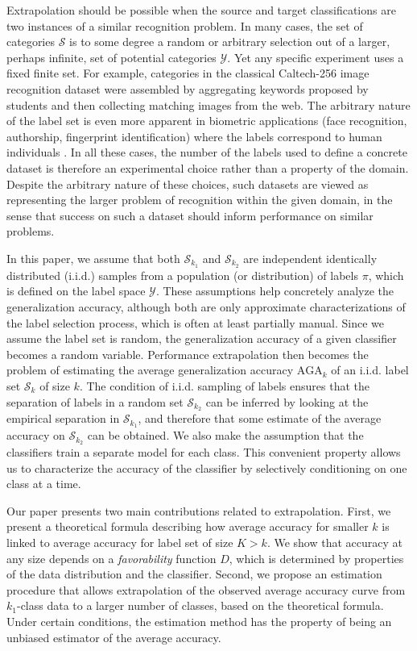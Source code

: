 \documentclass[twoside,11pt]{article}
\begin{document}
Extrapolation should be possible when the source and target
classifications are two instances of a similar recognition problem.  In
many cases, the set of categories $\mathcal{S}$ is to some degree a
random or arbitrary selection out of a larger, perhaps infinite, set
of potential categories $\mathcal{Y}$. Yet any specific experiment
uses a fixed finite set.  For example, categories in the classical
Caltech-256 image recognition dataset \citep{griffin2007caltech} were
assembled by aggregating keywords proposed by students and then
collecting matching images from the web.  The arbitrary nature of the
label set is even more apparent in biometric applications (face
recognition, authorship, fingerprint identification) where the labels
correspond to human individuals \citep{togneri2011overview,
  stamatatos2014overview}.  In all these cases, the number of the
labels used to define a concrete dataset is therefore an experimental
choice rather than a property of the domain.  Despite the arbitrary
nature of these choices, such datasets are viewed as representing the
larger problem of recognition within the given domain, in the sense
that success on such a dataset should inform performance on similar
problems.

In this paper, we assume that both $\mathcal{S}_{k_1}$ and
$\mathcal{S}_{k_2}$ are independent identically distributed (i.i.d.)
samples from a population (or distribution) of labels $ \pi$, which is
defined on the label space $\mathcal{Y}$.  These assumptions help
concretely analyze the generalization accuracy, although both are only
approximate characterizations of the label selection process, which is
often at least partially manual. Since we assume the label set is
random, the generalization accuracy of a given classifier becomes a
random variable.  Performance extrapolation then becomes the problem
of estimating the average generalization accuracy $\text{AGA}_k$ of an
i.i.d. label set $\mathcal{S}_k$ of size $k$.  The condition of
i.i.d. sampling of labels ensures that the separation of labels in a
random set $\mathcal{S}_{k_2}$ can be inferred by looking at the
empirical separation in $\mathcal{S}_{k_1}$, and therefore that some
estimate of the average accuracy on $\mathcal{S}_{k_2}$ can be
obtained.  We also make the assumption that the classifiers train a
separate model for each class.  This convenient property allows us to
characterize the accuracy of the classifier by selectively
conditioning on one class at a time.

Our paper presents two main contributions related to extrapolation.
First, we present a theoretical formula describing how average accuracy
for smaller $k$ is linked to average accuracy for label set of size
$K>k$.  We show that accuracy at any size depends on a
\emph{favorability} function ${D}$, which is determined by properties
of the data distribution and the classifier.  Second, we propose an
estimation procedure that allows extrapolation of the observed average
accuracy curve from $k_1$-class data to a larger number of classes,
based on the theoretical formula. Under certain conditions, the
estimation method has the property of being an unbiased estimator of
the average accuracy.
\end{document}
